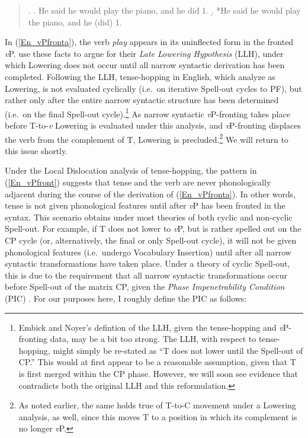 \singlespacing
\begin{quote}
\begin{minipage}{5in}
\ex. \label{En_vPfront}
\a. He said he would play the piano, and  he did 1. \label{En_vPfronta} 
\b. *He said he would play the piano, and  he (did) 1. \label{En_vPfrontb}

\end{minipage}
\end{quote}
\onehalfspacing
In (\ref{En_vPfronta}), the verb {\it play} appears in its uninflected form in the fronted \textit{v}P. \citet{embick_noyer2001} use these facts to argue for their \textit{Late Lowering Hypothesis} (LLH), under which Lowering does not occur until all narrow syntactic derivation has been completed. Following the LLH, tense-hopping in English, which \citeauthor{embick_noyer2001} analyze as Lowering, is not evaluated cyclically (i.e.\ on iterative Spell-out cycles to PF), but rather only after the entire narrow syntactic structure has been determined (i.e.\ on the final Spell-out cycle).\footnote{Embick and Noyer's defintion of the LLH, given the tense-hopping and \textit{v}P-fronting data, may be a bit too strong. The LLH, with respect to tense-hopping, might simply be re-stated as ``T does not lower until the Spell-out of CP.'' This would at first appear to be a reasonable assumption, given that T is first merged within the CP phase. However, we will soon see evidence that contradicts both the original LLH and this reformulation.}  As narrow syntactic \textit{v}P-fronting takes place before T-to-\textit{v} Lowering is evaluated under this analysis, and \textit{v}P-fronting displaces the verb from the complement of T, Lowering is precluded.\footnote{As noted earlier, the same holds true of T-to-C movement under a Lowering analysis, as well, since this moves T to a position in which its complement is no longer \textit{v}P.}  We will return to this issue shortly.

Under the Local Dislocation analysis of tense-hopping, the pattern in (\ref{En_vPfront}) suggests that tense and the verb are never phonologically adjacent during the course of the derivation of (\ref{En_vPfronta}). In other words, tense is not given phonological features until after \textit{v}P has been fronted in the syntax. This scenario obtains under most theories of both cyclic and non-cyclic Spell-out. For example, if T does not lower to \textit{v}P, but is rather spelled out on the CP cycle (or, alternatively, the final or only Spell-out cycle), it will not be given phonological features (i.e.\ undergo Vocabulary Insertion) until after all narrow syntactic transformations have taken place. Under a theory of cyclic Spell-out, this is due to the requirement that all narrow syntactic transformations occur before Spell-out of the matrix CP, given the \textit{Phase Impenetrability Condition} (PIC) \citep{chomsky2001}. For our purposes here, I roughly define the PIC as follows:

